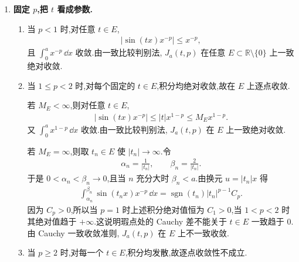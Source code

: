 \begin{exbox}
\begin{enumerate}
		综上,当 $t\neq0$ 时,
		\begin{gather*}
			\int_0^a \sin(tx)x^{-p}\,\dd x
			\begin{cases}
				\text{绝对收敛},&p<2,\\[3pt]
				\text{发散},&p\geq2.
			\end{cases}
		\end{gather*}
		这里没有条件收敛情形,因为在 $0$ 的充分小右邻域内, $\sin(tx)$ 不发生无限振荡抵消.

		\item \textbf{固定 $p$,把 $t$ 看成参数.}

		\begin{enumerate}
			\item 当 $p<1$ 时,对任意 $t\in E$,
			\begin{align*}
				|\sin(tx)x^{-p}|\leq x^{-p},
			\end{align*}
			且 $\int_0^a x^{-p}\,\dd x$ 收敛.由一致比较判别法, $J_a(t,p)$ 在任意 $E\subset\mathbb R\setminus\{0\}$ 上一致绝对收敛.

			\item 当 $1\leq p<2$ 时,对每个固定的 $t\in E$,积分均绝对收敛,故在 $E$ 上逐点收敛.

			若 $M_E<\infty$,则对任意 $t\in E$,
			\begin{align*}
				|\sin(tx)x^{-p}|
				\leq |t|x^{1-p}
				\leq M_E x^{1-p}.
			\end{align*}
			又 $\int_0^a x^{1-p}\,\dd x$ 收敛.由一致比较判别法, $J_a(t,p)$ 在 $E$ 上一致绝对收敛.

			若 $M_E=\infty$,则取 $t_n\in E$ 使 $|t_n|\to\infty$.令
			\begin{align*}
				\alpha_n=\frac1{|t_n|},
				\qquad
				\beta_n=\frac2{|t_n|}.
			\end{align*}
			于是 $0<\alpha_n<\beta_n\to0$,且当 $n$ 充分大时 $\beta_n<a$.由换元 $u=|t_n|x$ 得
			\begin{align*}
				\int_{\alpha_n}^{\beta_n}\sin(t_nx)x^{-p}\,\dd x
				=
				\operatorname{sgn}(t_n)|t_n|^{p-1}C_p.
			\end{align*}
			因为 $C_p>0$,所以当 $p=1$ 时上述积分绝对值恒为 $C_1>0$,当 $1<p<2$ 时其绝对值趋于 $+\infty$.这说明瑕点处的 Cauchy 差不能关于 $t\in E$ 一致趋于 $0$.由 Cauchy 一致收敛准则, $J_a(t,p)$ 在 $E$ 上不一致收敛.

			\item 当 $p\geq2$ 时,对每一个 $t\in E$,积分均发散,故逐点收敛性不成立.
		\end{enumerate}


\end{enumerate}
\end{exbox}
